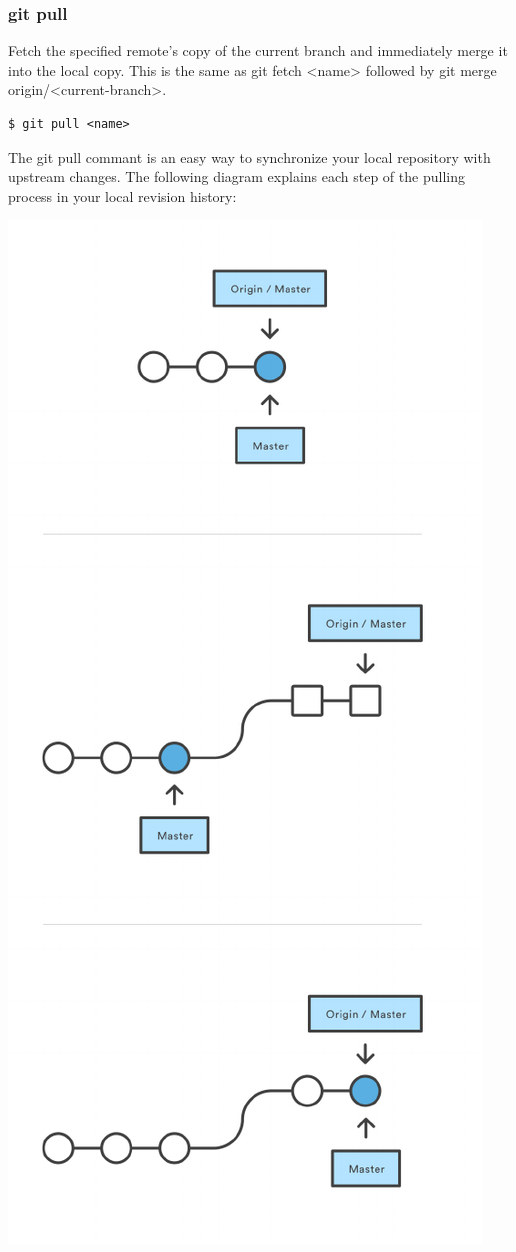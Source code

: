 \documentclass{article}
\begin{document}
\subsubsection*{git pull}

Fetch the specified remote's copy of the current branch and
immediately merge it into the local copy. This is the same as git
fetch <name> followed by git merge origin/<current-branch>.

\begin{lstlisting}
$ git pull <name>
\end{lstlisting}

The git pull commant is an easy way to synchronize your local repository with upstream
changes. The following diagram explains each step of the pulling
process in your local revision history: 

\begin{center}
\includegraphics[scale=0.7]{figures/07.pdf}

\end{center}
\end{document}
